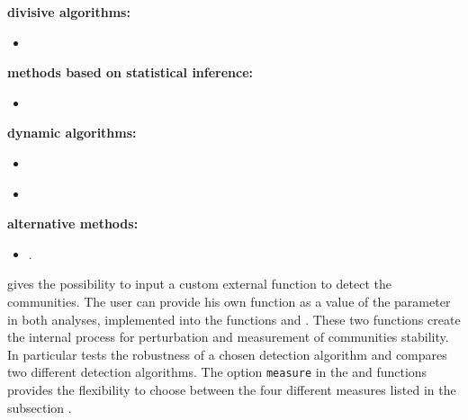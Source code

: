 \textbf{divisive algorithms:}

\begin{itemize}

\item {} \citep{Newman:2004}

\end{itemize}

\textbf{methods based on statistical inference:}

\begin{itemize}

\item {} \citep{Rosvall:2008}

\end{itemize}

\textbf{dynamic algorithms:}

\begin{itemize}

\item {} \citep{Reichard:2006} 

\item {} \citep{Pons:2005}

\end{itemize}

\textbf{alternative methods:}

\begin{itemize}

\item {} \citep{Raghavan:2007}.

\end{itemize}



 gives the possibility to input a custom external function to detect the communities. 
The user can provide his own function as a value of the parameter  in both analyses, implemented into the functions  and . These two functions create the internal process for perturbation and  measurement of communities stability. In particular  tests the robustness of a chosen detection algorithm and  compares two different detection algorithms. The option {\tt measure} in the  and  functions provides the flexibility to choose between the four different measures listed in the subsection \textbf{}.

